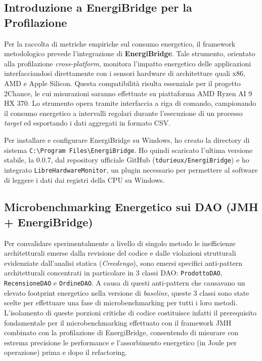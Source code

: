 \subsection{Introduzione a EnergiBridge per la Profilazione}

Per la raccolta di metriche empiriche sul consumo energetico, il framework metodologico prevede l'integrazione di \textbf{EnergiBridge}. Tale strumento, orientato alla profilazione \textit{cross-platform}, monitora l'impatto energetico delle applicazioni interfacciandosi direttamente con i sensori hardware di architetture quali x86, AMD e Apple Silicon. Questa compatibilità risulta essenziale per il progetto 2Chance, le cui misurazioni saranno effettuate su piattaforma AMD Ryzen AI 9 HX 370. Lo strumento opera tramite interfaccia a riga di comando, campionando il consumo energetico a intervalli regolari durante l'esecuzione di un processo \textit{target} ed esportando i dati aggregati in formato CSV.

Per installare e configurare EnergiBridge su Windows, ho creato la directory di sistema \texttt{C:\textbackslash Program Files\textbackslash EnergiBridge}. Ho quindi scaricato l'ultima versione stabile, la 0.0.7, dal repository ufficiale GitHub (\texttt{tdurieux/EnergiBridge}) e ho integrato \texttt{LibreHardwareMonitor}, un plugin necessario per permettere al software di leggere i dati dai registri della CPU su Windows.

\subsection{Microbenchmarking Energetico sui DAO (JMH + EnergiBridge)}

Per convalidare sperimentalmente a livello di singolo metodo le inefficienze architetturali emerse dalla revisione del codice e dalle violazioni strutturali evidenziate dall'analisi statica (\textit{Creedengo}), sono emersi specifici anti-pattern architetturali concentrati in particolare in 3 classi DAO: \texttt{ProdottoDAO}, \texttt{RecensioneDAO} e \texttt{OrdineDAO}. A causa di questi anti-pattern che causavano un elevato footprint energetico nella versione di \textit{baseline}, queste 3 classi sono state scelte per effettuare una fase di microbenchmarking per tutti i loro metodi. L'isolamento di queste porzioni critiche di codice costituisce infatti il prerequisito fondamentale per il microbenchmarking effettuato con il framework JMH combinato con la profilazione di EnergiBridge, consentendo di misurare con estrema precisione le performance e l'assorbimento energetico (in Joule per operazione) prima e dopo il refactoring.

